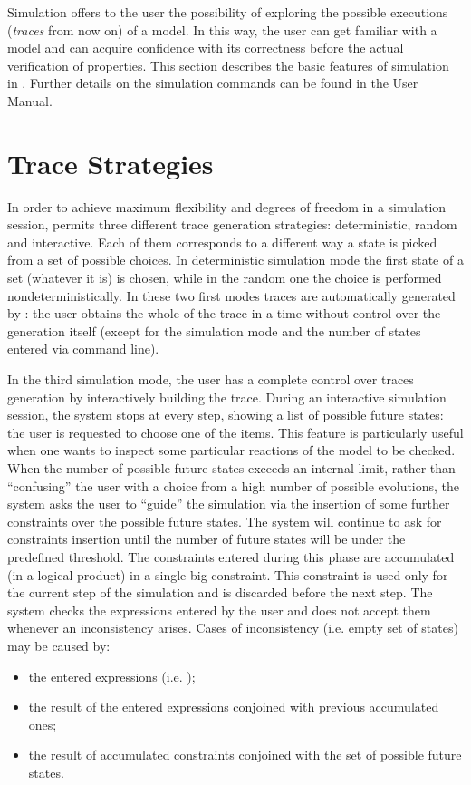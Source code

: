 Simulation offers to the user the possibility of exploring the possible
executions (\emph{traces} from now on) of a \nusmv model. 
In this way, the user can get familiar with a model and can acquire
confidence with its correctness before the actual verification of
properties.
This section describes the basic features of simulation in
\nusmv. Further details on the simulation commands
can be found in the \NuSMV User Manual.


\section{Trace Strategies}
\label{Trace Strategies}

In order to achieve maximum flexibility and degrees of freedom in a
simulation session, \nusmv permits three different trace
generation strategies: deterministic, random and interactive.
Each of them corresponds to a different way a state is picked from a set 
of possible choices.
In deterministic simulation mode the first state of a set (whatever it is) is
chosen, while in the random one the choice is performed nondeterministically.
In these two first modes traces are automatically generated by \nusmv:
the user obtains the whole of the trace in a time without control over the generation
itself (except for the simulation mode and the number of states entered via
command line).

In the third simulation mode, the user has a complete control over traces generation
by interactively building the trace. During an interactive simulation session,
the system stops at every step, showing a list of possible future states: the
user is requested to choose one of the items. This feature is particularly
useful when one wants to inspect some particular reactions of the model to
be checked.
When the number of possible future states exceeds an internal limit,
rather than ``confusing'' the user with a choice from a high number of
possible evolutions, the system
asks the user to ``guide'' the simulation via the insertion of some further
constraints over the possible future states.
The system will continue to ask for constraints insertion until the number of
future states will be under the predefined threshold. 
The constraints entered during this phase are accumulated (in a logical
product) in a single big constraint. This constraint is used only for
the current step of the simulation and is discarded before the next step.
The system checks the expressions entered by the user and 
does not accept them whenever an inconsistency arises.
Cases of inconsistency (i.e. empty set of states) may be caused by:
\begin{itemize}
\item the entered expressions (i.e. );
\item the result of the entered expressions conjoined with previous accumulated ones;
\item the result of accumulated constraints conjoined with the set of possible 
future states.
\end{itemize}


